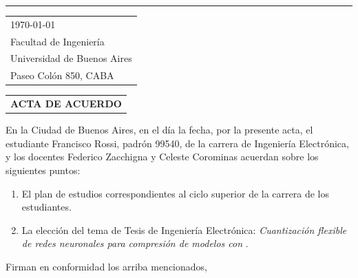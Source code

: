 \documentclass{article}
\begin{document}
\vspace{-1em} %

\rule{\linewidth}{1pt} %

\bigskip\bigskip %


\hfill
\begin{tabular}{l @{}}
	\today \bigskip\\ %
	Facultad de Ingeniería \\
	Universidad de Buenos Aires \\
	Paseo Colón 850, CABA
\end{tabular}

\bigskip %


\begin{tabular}{@{} l}
	\textbf{ACTA DE ACUERDO}
\end{tabular}


\bigskip


En la Ciudad de Buenos Aires, en el día la fecha, por la  presente acta, el estudiante Francisco Rossi, padrón 99540, de la carrera de Ingeniería Electrónica, y los docentes Federico Zacchigna y Celeste Corominas acuerdan sobre los siguientes puntos:

\begin{enumerate}
    \item El plan de estudios correspondientes al ciclo superior de la carrera de los estudiantes.
    \item La elección del tema de Tesis de Ingeniería Electrónica: \textit{Cuantización flexible de redes neuronales para compresión de modelos con }.
\end{enumerate}

Firman en conformidad los arriba mencionados,
\end{document}
